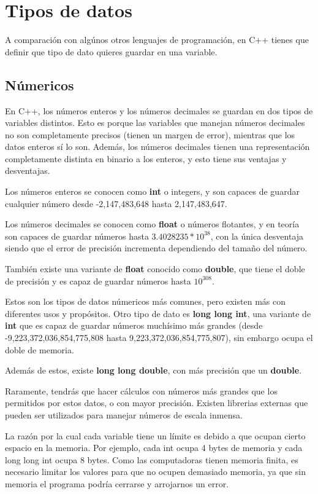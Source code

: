 \documentclass{article}
\begin{document}
\section{Tipos de datos}

A comparación con algúnos otros lenguajes de programación, en C++ tienes que definir que tipo de dato quieres guardar en una variable.

\subsection{Númericos}

En C++, los números enteros y los números decimales se guardan en dos tipos de variables distintos. Esto es porque las variables que manejan números decimales no son completamente precisos (tienen un margen de error), mientras que los datos enteros sí lo son. Además, los números decimales tienen una representación completamente distinta en binario a los enteros, y esto tiene sus ventajas y desventajas.

Los números enteros se conocen como \textbf{int} o integers, y son capaces de guardar cualquier número desde -2,147,483,648 hasta 2,147,483,647.

Los números decimales se conocen como \textbf{float} o números flotantes, y en teoría son capaces de guardar números hasta $3.4028235*10^{38}$, con la única desventaja siendo que el error de precisión incrementa dependiendo del tamaño del número.

También existe una variante de \textbf{float} conocido como \textbf{double}, que tiene el doble de precisión y es capaz de guardar números hasta $10^{308}$.

Estos son los tipos de datos númericos más comunes, pero existen más con diferentes usos y propósitos. Otro tipo de dato es \textbf{long long int}, una variante de \textbf{int} que es capaz de guardar números muchísimo más grandes (desde -9,223,372,036,854,775,808 hasta 9,223,372,036,854,775,807), sin embargo ocupa el doble de memoria.

Además de estos, existe \textbf{long long double}, con más precisión que un \textbf{double}.

Raramente, tendrás que hacer cálculos con números más grandes que los permitidos por estos datos, o con mayor precisión. Existen librerias externas que pueden ser utilizados para manejar números de escala inmensa.

La razón por la cual cada variable tiene un límite es debido a que ocupan cierto espacio en la memoria. Por ejemplo, cada int ocupa 4 bytes de memoria y cada long long int ocupa 8 bytes. Como las computadoras tienen memoria finita, es necesario limitar los valores para que no ocupen demasiado memoria, ya que sin memoria el programa podría cerrarse y arrojarnos un error.
\end{document}
